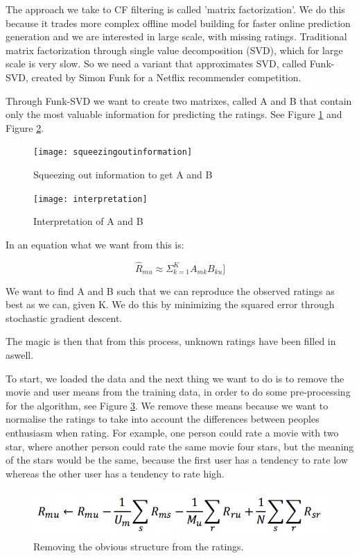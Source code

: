 	The approach we take to CF filtering is called 'matrix factorization'.
	We do this because it trades more complex offline model building for faster online prediction
	generation and we are interested in large scale, with missing ratings.
	Traditional matrix factorization through single value decomposition (SVD), which for large scale is very slow.
	So we need a variant that approximates SVD, called Funk-SVD, created by Simon Funk for a Netflix recommender competition.
	
	Through Funk-SVD we want to create two matrixes, called A and B that contain only the most valuable information for predicting the ratings. See Figure \ref{fig:squeeze} and Figure \ref{fig:interpretation}.
	
	\begin{figure}[h]
		\centering
		\texttt{[image: squeezingoutinformation]}
		\caption{Squeezing out information to get A and B}\label{fig:squeeze}
	\end{figure}
	
	\begin{figure}[h]
		\centering
		\texttt{[image: interpretation]}
		\caption{Interpretation of A and B}\label{fig:interpretation}
	\end{figure}
	
	In an equation what we want from this is:
	
	$$\hat{R}_{mu} \approx \Sigma_{k=1}^K A_{mk} B_{ku}]$$
	
	We want to find A and B such that we can reproduce the observed ratings as best as we can, given K. 
	We do this by minimizing the squared error through stochastic gradient descent.
	
	The magic is then that from this process, unknown ratings have been filled in aswell.
	
	To start, we loaded the data and the next thing we want to do is to remove the movie and user means from the training data, in order to do some pre-processing for the algorithm, see Figure \ref{fig:obv}. 
	We remove these means because we want to normalise the ratings to take into account the differences between peoples enthusiasm when rating. For example, one person could rate a movie with two star, where another person could rate the same movie four stars, but the meaning of the stars would be the same, because the first user has a tendency to rate low whereas the other user has a tendency to rate high.
	
	\begin{figure}[h]
		\centering
		\includegraphics[scale=0.5]{obviousstructure}
		\caption{Removing the obvious structure from the ratings.}\label{fig:obv}
	\end{figure}
	
